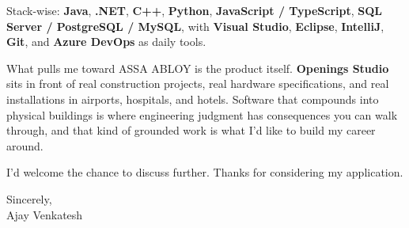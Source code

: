 \documentclass[letterpaper,11pt]{article}
\begin{document}
Stack-wise: \textbf{Java}, \textbf{.NET}, \textbf{C++}, \textbf{Python}, \textbf{JavaScript / TypeScript}, \textbf{SQL Server / PostgreSQL / MySQL}, with \textbf{Visual Studio}, \textbf{Eclipse}, \textbf{IntelliJ}, \textbf{Git}, and \textbf{Azure DevOps} as daily tools.

What pulls me toward ASSA ABLOY is the product itself. \textbf{Openings Studio} sits in front of real construction projects, real hardware specifications, and real installations in airports, hospitals, and hotels. Software that compounds into physical buildings is where engineering judgment has consequences you can walk through, and that kind of grounded work is what I'd like to build my career around.

I'd welcome the chance to discuss further. Thanks for considering my application.

\vspace{12pt}
Sincerely, \\
Ajay Venkatesh
\end{document}
